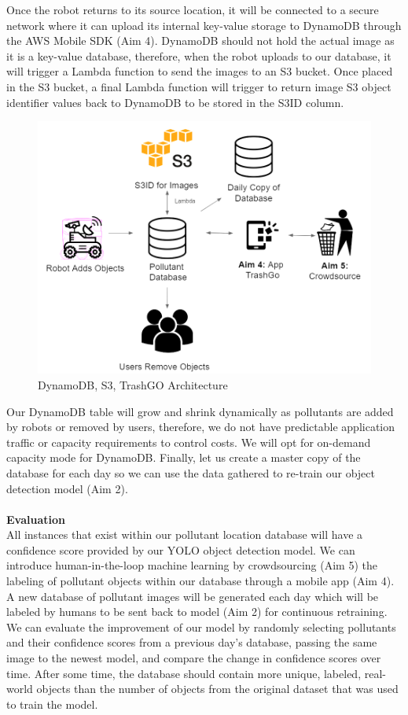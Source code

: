 \documentclass[
  journal=small,
  manuscript=article-type,  %
  year=2022,
  volume=1,
]{cup-journal}
\begin{document}
Once the robot returns to its source location, it will be connected to a secure network where it can upload its internal key-value storage to DynamoDB through the AWS Mobile SDK (Aim 4). DynamoDB should not hold the actual image as it is a key-value database, therefore, when the robot uploads to our database, it will trigger a Lambda function to send the images to an S3 bucket. Once placed in the S3 bucket, a final Lambda function will trigger to return image S3 object identifier values back to DynamoDB to be stored in the S3ID column. 

\begin{figure}[h!]
    \hspace*{-.75cm}
    \includegraphics[scale = .35]{DyanamoS3sync.png}
    \caption{DynamoDB, S3, TrashGO Architecture}
    \label{trash_db}
\end{figure}

Our DynamoDB table will grow and shrink dynamically as pollutants are added by robots or removed by users, therefore, we do not have predictable application traffic or capacity requirements to control costs. We will opt for on-demand capacity mode for DynamoDB. Finally, let us create a master copy of the database for each day so we can use the data gathered to re-train our object detection model (Aim 2). 
\\\\\textbf{Evaluation}\\
All instances that exist within our pollutant location database will have a confidence score provided by our YOLO object detection model. We can introduce human-in-the-loop machine learning by crowdsourcing (Aim 5) the labeling of pollutant objects within our database through a mobile app (Aim 4). A new database of pollutant images will be generated each day which will be labeled by humans to be sent back to model (Aim 2) for continuous retraining. We can evaluate the improvement of our model by randomly selecting pollutants and their confidence scores from a previous day's database, passing the same image to the newest model, and compare the change in confidence scores over time. After some time, the database should contain more unique, labeled, real-world objects than the number of objects from the original dataset that was used to train the model. 
\end{document}
